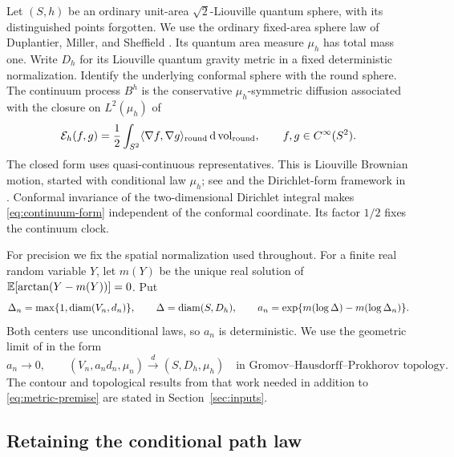 Let $(S,h)$ be an ordinary unit-area $\sqrt2$-Liouville quantum sphere,
with its distinguished points forgotten. We use the ordinary fixed-area
sphere law of Duplantier, Miller, and Sheffield \cite{DMS}. Its quantum
area measure $\mu_h$ has total mass one. Write $D_h$ for its Liouville
quantum gravity metric in a fixed deterministic normalization. Identify
the underlying conformal sphere with the round sphere. The continuum
process $B^h$ is the conservative $\mu_h$-symmetric diffusion associated
with the closure on $L^2(\mu_h)$ of
\begin{equation}\label{eq:continuum-form}
 \mathcal E_h(f,g)=\frac12\int_{S^2}
      \langle\nabla f,\nabla g\rangle_{\mathrm{round}}
                    \,\mathrm d\operatorname{vol}_{\mathrm{round}},
 \qquad f,g\in C^\infty(S^2).
\end{equation}
The closed form uses quasi-continuous representatives. This is Liouville
Brownian motion, started with conditional law $\mu_h$; see
\cite{GRV,Berestycki} and the Dirichlet-form framework in \cite{FOT}.
Conformal invariance of the two-dimensional Dirichlet integral makes
\eqref{eq:continuum-form} independent of the conformal coordinate. Its
factor $1/2$ fixes the continuum clock.

For precision we fix the spatial normalization used throughout. For a
finite real random variable $Y$, let $m(Y)$ be the unique real solution
of $\mathbb E[\arctan(Y-m(Y))]=0$. Put
\begin{equation}\label{eq:spatial-normalization}
 \Delta_n=\max\{1,\operatorname{diam}(V_n,d_n)\},\qquad
 \Delta=\operatorname{diam}(S,D_h),\qquad
 a_n=\exp\{m(\log\Delta)-m(\log\Delta_n)\}.
\end{equation}
Both centers use unconditional laws, so $a_n$ is deterministic. We use
the geometric limit of \cite{MetricMaps} in the form
\begin{equation}\label{eq:metric-premise}
 a_n\longrightarrow0,
 \qquad (V_n,a_nd_n,\mu_n)
       \xrightarrow{\ d\ }(S,D_h,\mu_h)
 \quad\text{in Gromov--Hausdorff--Prokhorov topology}.
\end{equation}
The contour and topological results from that work needed in addition
to \eqref{eq:metric-premise} are stated in Section~\ref{sec:inputs}.

\subsection{Retaining the conditional path law}

